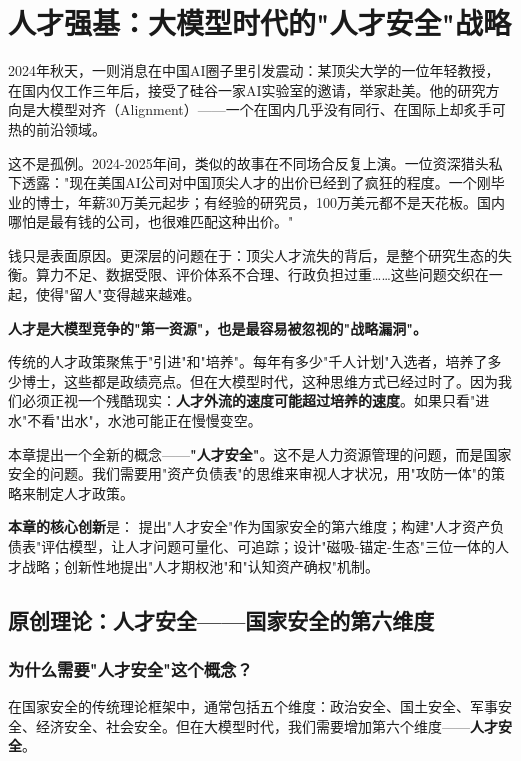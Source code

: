\chapter{人才强基：大模型时代的"人才安全"战略}

2024年秋天，一则消息在中国AI圈子里引发震动：某顶尖大学的一位年轻教授，在国内仅工作三年后，接受了硅谷一家AI实验室的邀请，举家赴美。他的研究方向是大模型对齐（Alignment）——一个在国内几乎没有同行、在国际上却炙手可热的前沿领域。

这不是孤例。2024-2025年间，类似的故事在不同场合反复上演。一位资深猎头私下透露："现在美国AI公司对中国顶尖人才的出价已经到了疯狂的程度。一个刚毕业的博士，年薪30万美元起步；有经验的研究员，100万美元都不是天花板。国内哪怕是最有钱的公司，也很难匹配这种出价。"

钱只是表面原因。更深层的问题在于：顶尖人才流失的背后，是整个研究生态的失衡。算力不足、数据受限、评价体系不合理、行政负担过重……这些问题交织在一起，使得"留人"变得越来越难。

\textbf{人才是大模型竞争的"第一资源"，也是最容易被忽视的"战略漏洞"。}

传统的人才政策聚焦于"引进"和"培养"。每年有多少"千人计划"入选者，培养了多少博士，这些都是政绩亮点。但在大模型时代，这种思维方式已经过时了。因为我们必须正视一个残酷现实：\textbf{人才外流的速度可能超过培养的速度}。如果只看"进水"不看"出水"，水池可能正在慢慢变空。

本章提出一个全新的概念——\textbf{"人才安全"}。这不是人力资源管理的问题，而是国家安全的问题。我们需要用"资产负债表"的思维来审视人才状况，用"攻防一体"的策略来制定人才政策。

\textbf{本章的核心创新}是：
提出"人才安全"作为国家安全的第六维度；构建"人才资产负债表"评估模型，让人才问题可量化、可追踪；设计"磁吸-锚定-生态"三位一体的人才战略；创新性地提出"人才期权池"和"认知资产确权"机制。

\section{原创理论：人才安全——国家安全的第六维度}

\subsection{为什么需要"人才安全"这个概念？}

在国家安全的传统理论框架中，通常包括五个维度：政治安全、国土安全、军事安全、经济安全、社会安全。但在大模型时代，我们需要增加第六个维度——\textbf{人才安全}。

